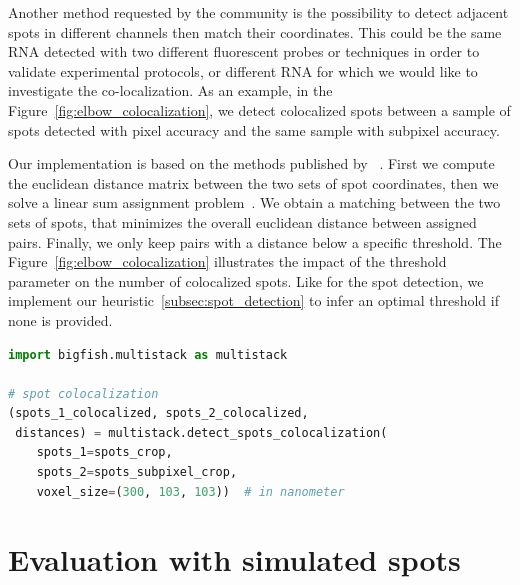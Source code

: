 Another method requested by the community is the possibility to detect adjacent spots in different channels then match their coordinates.
This could be the same \ac{RNA} detected with two different fluorescent probes or techniques in order to validate experimental protocols, or different \ac{RNA} for which we would like to investigate the co-localization.
As an example, in the Figure~\ref{fig:elbow_colocalization}, we detect colocalized spots between a sample of spots detected with pixel accuracy and the same sample with subpixel accuracy.

Our implementation is based on the methods published by ~\cite{CORNES_2022}.
First we compute the euclidean distance matrix between the two sets of spot coordinates, then we solve a linear sum assignment problem~\cite{crouse_linear_assignment_2016, 2020SciPy-NMeth}.
We obtain a matching between the two sets of spots, that minimizes the overall euclidean distance between assigned pairs.
Finally, we only keep pairs with a distance below a specific threshold.
The Figure~\ref{fig:elbow_colocalization} illustrates the impact of the threshold parameter on the number of colocalized spots.
Like for the spot detection, we implement our heuristic~\ref{subsec:spot_detection} to infer an optimal threshold if none is provided.\\

\begin{minipage}{0.9\textwidth}
\begin{lstlisting}[language=Python]
import bigfish.multistack as multistack

# spot colocalization
(spots_1_colocalized, spots_2_colocalized,
 distances) = multistack.detect_spots_colocalization(
	spots_1=spots_crop,
	spots_2=spots_subpixel_crop,
	voxel_size=(300, 103, 103))  # in nanometer
\end{lstlisting}
\end{minipage}


\section{Evaluation with simulated spots}
\label{sec:detection_evaluation}

